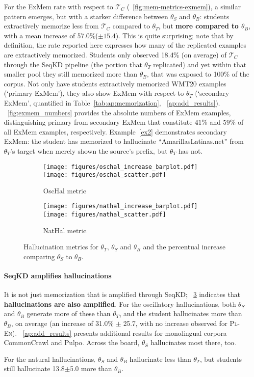 For the ExMem rate with respect to $\mathcal{T}_C$ (\figureshortcut~\ref{fig:mem-metrics-exmem}), a similar pattern emerges, but with a starker difference between $\theta_S$ and $\theta_B$: students extractively memorize less from $\mathcal{T}_C$ compared to $\theta_T$, but \textbf{more compared to $\theta_B$}, with a mean increase of 57.0\%($\pm15.4$).
This is quite surprising; note that by definition, the rate reported here expresses how many of the replicated examples are extractively memorized. Students only observed 18.4\% (on average) of $\mathcal{T}_C$ through the SeqKD pipeline (the portion that $\theta_T$ replicated) and yet within that smaller pool they still memorized more than $\theta_B$, that was exposed to 100\% of the corpus.
Not only have students extractively memorized WMT20 examples (`primary ExMem'), they also show ExMem with respect to $\theta_T$ (`secondary ExMem', quantified in Table~\ref{tab:ap:memorization}, \appendixshortcut~\ref{ap:add_results}).
\figureshortcut~\ref{fig:exmem_numbers} provides the absolute numbers of ExMem examples, distinguishing primary from secondary ExMem that constitute 41\% and 59\% of all ExMem examples, respectively.
Example~\ref{ex2} demonstrates secondary ExMem: the student has memorized to hallucinate ``AmarillasLatinas.net'' from $\theta_T$'s target when merely shown the source's prefix, but $\theta_T$ has not.

\begin{figure}[!t]
    \centering
    \begin{subfigure}[b]{0.49\columnwidth}
        \texttt{[image: figures/oschal\_increase\_barplot.pdf]}
        \texttt{[image: figures/oschal\_scatter.pdf]}
        \caption{OscHal metric}
        \label{fig:mem-metrics-oschal}
    \end{subfigure}
    \begin{subfigure}[b]{0.48\columnwidth}
        \texttt{[image: figures/nathal\_increase\_barplot.pdf]}
        \texttt{[image: figures/nathal\_scatter.pdf]}
        \caption{NatHal metric}
        \label{fig:mem-metrics-nathal}
    \end{subfigure}
    \caption{Hallucination metrics for  $\theta_T$, $\theta_S$ and $\theta_B$ and the percentual increase comparing $\theta_S$ to $\theta_B$.}
    \label{fig:hal-metrics}
\end{figure}


\paragraph{SeqKD amplifies hallucinations}
It is not just memorization that is amplified through SeqKD; \figureshortcut~\ref {fig:hal-metrics} indicates that \textbf{hallucinations are also amplified}.
For the oscillatory hallucinations, both $\theta_S$ and $\theta_B$ generate more of these than $\theta_T$, and the student hallucinates more than $\theta_B$, on average (an increase of 31.0\% $\pm$ 25.7, with no increase observed for \textsc{Pl}-\textsc{En}). 
\appendixshortcut~\ref{ap:add_results} presents additional results for monolingual corpora CommonCrawl and Pulpo. Across the board, $\theta_S$ hallucinates most there, too.

For the natural hallucinations, $\theta_S$ and $\theta_B$ hallucinate less than $\theta_T$, but students still hallucinate 13.8$\pm$5.0 more than $\theta_B$.

